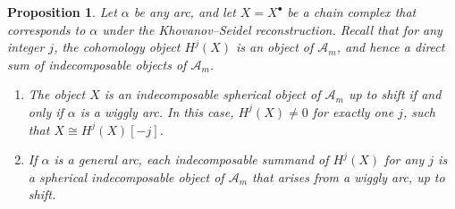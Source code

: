 \documentclass{amsart}
\newtheorem{proposition}[theorem]{Proposition}
\theoremstyle{definition}
\begin{document}
\begin{proposition}\label{prop:cohomology-pieces}
  Let \(\alpha\) be any arc, and let \(X = X^{\bullet}\) be a chain complex that corresponds to \(\alpha\) under the Khovanov--Seidel reconstruction.
  Recall that for any integer \(j\), the cohomology object \(H^j(X)\) is an object of \(\mathcal{A}_m\), and hence a direct sum of indecomposable objects of \(\mathcal{A}_m\).
  \begin{enumerate}
  \item The object \(X\) is an indecomposable spherical object of \(\mathcal{A}_m\) up to shift if and only if \(\alpha\) is a wiggly arc.
    In this case, \(H^j(X) \neq 0\) for exactly one \(j\), such that \(X \cong H^j(X)[-j]\).
  \item If \(\alpha\) is a general arc, each indecomposable summand of \(H^j(X)\) for any \(j\) is a spherical indecomposable object of \(\mathcal{A}_m\) that arises from a wiggly arc, up to shift.
  \end{enumerate}
\end{proposition}
\end{document}
